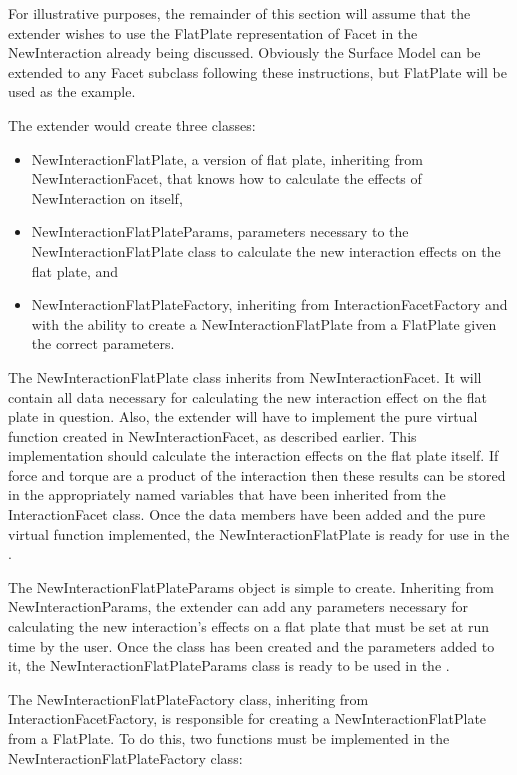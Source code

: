 For illustrative purposes, the remainder of this section will assume that
the extender wishes to use the FlatPlate representation of Facet in
the NewInteraction already being discussed. Obviously the Surface Model
can be extended to any Facet subclass following these instructions, but FlatPlate
will be used as the example.

The extender would create
three classes:

\begin{itemize}
\item{NewInteractionFlatPlate}, a version of flat plate, inheriting from
NewInteractionFacet, that knows how to calculate the effects of NewInteraction
on itself,
\item{NewInteractionFlatPlateParams}, parameters necessary to the
NewInteractionFlatPlate class to calculate the new interaction effects on
the flat plate, and
\item{NewInteractionFlatPlateFactory}, inheriting from InteractionFacetFactory
and with the ability to create a NewInteractionFlatPlate from a FlatPlate
given the correct parameters.
\end{itemize}

The NewInteractionFlatPlate class inherits from NewInteractionFacet. It will contain
all data necessary for calculating the new interaction effect on the flat plate
in question. Also, the extender will have to implement the pure virtual function
created in NewInteractionFacet, as described earlier. This implementation should
calculate the interaction effects on the flat plate itself. If force and torque
are a product of the interaction then these results can be stored in the
appropriately named variables that have been inherited from the
InteractionFacet class. Once the data members have been added and the
pure virtual function implemented, the NewInteractionFlatPlate is ready
for use in the \ModelDesc.

The NewInteractionFlatPlateParams object is simple to create. Inheriting
from NewInteractionParams, the extender can add any parameters necessary for
calculating the new interaction's effects on a flat plate that must be
set at run time by the user. Once the class has been created and the parameters
added to it, the NewInteractionFlatPlateParams class is ready to be used in the
\ModelDesc.

The NewInteractionFlatPlateFactory class, inheriting from InteractionFacetFactory,
is responsible for creating a NewInteractionFlatPlate from a FlatPlate.
To do this, two functions must be implemented in the NewInteractionFlatPlateFactory
class:

